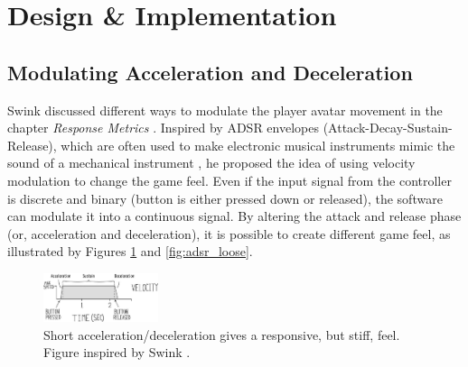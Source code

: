 \section{Design \& Implementation} \label{design}
\subsection{Modulating Acceleration and Deceleration}
Swink discussed different ways to modulate the player avatar movement in the chapter \textit{Response Metrics} \cite{swink}. Inspired by ADSR envelopes (Attack-Decay-Sustain-Release), which are often used to make electronic musical instruments mimic the sound of a mechanical instrument \cite{adsr}, he proposed the idea of using velocity modulation to change the game feel. Even if the input signal from the controller is discrete and binary (button is either pressed down or released), the software can modulate it into a continuous signal. By altering the attack and release phase (or, acceleration and deceleration), it is possible to create different game feel, as illustrated by Figures \ref{fig:adsr_stiff} and \ref{fig:adsr_loose}.





\begin{figure}[htbp]
\centering
\includegraphics[width=0.30\textwidth]{Pics/adsr_stiff}
\caption{Short acceleration/deceleration gives a responsive, but stiff, feel. Figure inspired by Swink \cite{swink}.}
\label{fig:adsr_stiff}
\end{figure}

